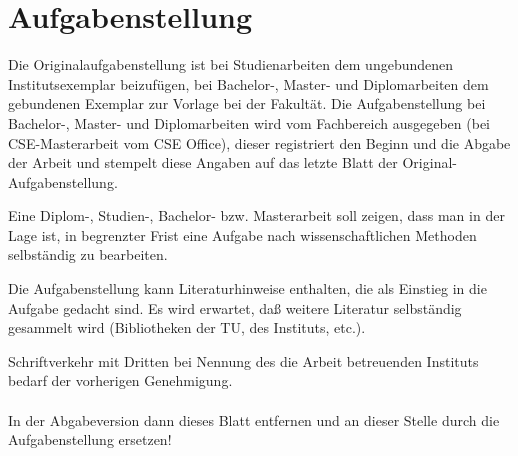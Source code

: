 \chapter*{Aufgabenstellung}

Die Originalaufgabenstellung ist bei Studienarbeiten dem ungebundenen Institutsexemplar beizufügen, bei Bachelor-, Master- und Diplomarbeiten dem 
gebundenen Exemplar zur Vorlage bei der Fakultät. Die Aufgabenstellung bei Bachelor-, Master- und Diplomarbeiten wird vom Fachbereich ausgegeben 
(bei CSE-Masterarbeit vom CSE Office), dieser registriert den Beginn und die Abgabe der Arbeit und stempelt diese Angaben auf das letzte Blatt der 
Original-Aufgabenstellung.

Eine Diplom-, Studien-, Bachelor- bzw. Masterarbeit soll zeigen, dass man in der Lage ist, in begrenzter Frist eine Aufgabe nach wissenschaftlichen Methoden 
selbständig zu bearbeiten.

Die Aufgabenstellung kann Literaturhinweise enthalten, die als Einstieg in die Aufgabe gedacht
sind. Es wird erwartet, daß weitere Literatur selbständig gesammelt wird (Bibliotheken
der TU, des Instituts, etc.).

 Schriftverkehr mit Dritten bei Nennung des die Arbeit betreuenden Instituts bedarf der
vorherigen Genehmigung.
\\ 
\\
In der Abgabeversion dann dieses Blatt entfernen und an dieser Stelle durch die Aufgabenstellung ersetzen!
